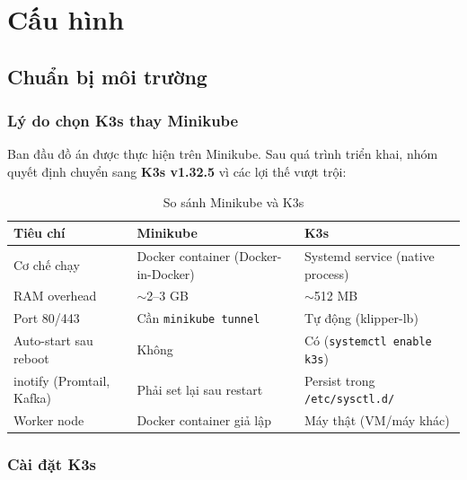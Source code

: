\chapter{Cấu hình}

\section{Chuẩn bị môi trường}

\subsection{Lý do chọn K3s thay Minikube}

Ban đầu đồ án được thực hiện trên Minikube. Sau quá trình triển khai, nhóm quyết định
chuyển sang \textbf{K3s v1.32.5} vì các lợi thế vượt trội:

\begin{table}[H]
	\centering
	\caption{So sánh Minikube và K3s}
	\begin{tabularx}{\textwidth}{L{4cm}L{4.5cm}L{4.5cm}}
		\toprule
		\textbf{Tiêu chí}         & \textbf{Minikube}                   & \textbf{K3s}                          \\
		\midrule
		Cơ chế chạy               & Docker container (Docker-in-Docker) & Systemd service (native process)      \\
		RAM overhead              & $\sim$2--3 GB                       & $\sim$512 MB                          \\
		Port 80/443               & Cần \texttt{minikube tunnel}        & Tự động (klipper-lb)                  \\
		Auto-start sau reboot     & Không                               & Có (\texttt{systemctl enable k3s})    \\
		inotify (Promtail, Kafka) & Phải set lại sau restart            & Persist trong \texttt{/etc/sysctl.d/} \\
		Worker node               & Docker container giả lập            & Máy thật (VM/máy khác)                \\
		\bottomrule
	\end{tabularx}
\end{table}

\subsection{Cài đặt K3s}

